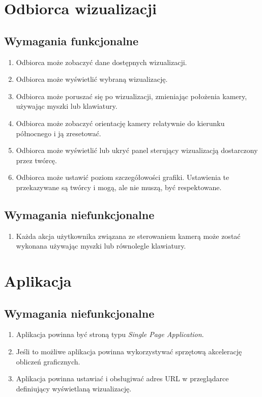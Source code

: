 \section{Odbiorca wizualizacji}

\subsection{Wymagania funkcjonalne}
\begin{enumerate}
    \item Odbiorca może zobaczyć dane dostępnych wizualizacji.
    \item Odbiorca może wyświetlić wybraną wizualizację.
    \item Odbiorca może poruszać się po wizualizacji, zmieniając położenia kamery, używając myszki lub klawiatury.
    \item Odbiorca może zobaczyć orientację kamery relatywnie do kierunku północnego i ją zresetować.
    \item Odbiorca może wyświetlić lub ukryć panel sterujący wizualizacją dostarczony przez twórcę.
    \item Odbiorca może ustawić poziom szczegółowości grafiki. Ustawienia te przekazywane są twórcy i mogą, ale nie muszą, być respektowane.
\end{enumerate}
\subsection{Wymagania niefunkcjonalne}
\begin{enumerate}
    \item Każda akcja użytkownika związana ze sterowaniem kamerą może zostać wykonana używając myszki lub równolegle klawiatury.
\end{enumerate}

\section{Aplikacja}

\subsection{Wymagania niefunkcjonalne}
\begin{enumerate}
    \item Aplikacja powinna być stroną typu \textit{Single Page Application}. %
    \item Jeśli to możliwe aplikacja powinna wykorzystywać sprzętową akcelerację obliczeń graficznych.
    \item Aplikacja powinna ustawiać i obsługiwać adres URL w przeglądarce definiujący wyświetlaną wizualizację.
\end{enumerate}


